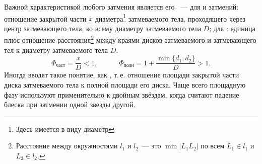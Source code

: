 Важной характеристикой любого затмения является его ~--- для  и  затмений: отношение закрытой части $x$ диаметра\footnote{Здесь имеется в виду  диаметр} затмеваемого тела, проходящего через центр затмевающего тела, ко всему диаметру затмеваемого тела $D$; для : единица плюс отношение расстояния\footnote{Расстояние между окружностями $l_1$ и $l_2$~--- это $\min |L_1L_2|$ по всем $L_1 \in l_1$ и $L_2 \in l_2$.} между краями дисков затмеваемого и затмевающего тел к диаметру затмеваемого тела $D$.
\begin{equation}
	\Phi_{\text{част}} = \frac{x}{D} < 1, \quad \quad \quad \Phi_{\text{полн}} =  1 + \frac{\min\{d_1, d_2\}}{D} > 1.
\end{equation}
Иногда вводят такое понятие, как , т.\,е. отношение площади закрытой части диска затмеваемого тела к полной площади его диска. Чаще всего  площадную фазу используют применительно к двойным звёздам, когда считают падение блеска при затмении одной звезды другой.
